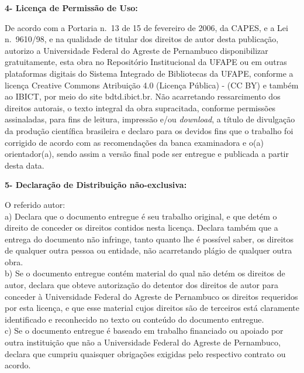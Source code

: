 \documentclass[10pt,a4paper]{article}
\newcommand{\gap}[2]{\vspace{#2mm}}
\begin{document}
\gap{obs-4}{0.8}

\noindent\textbf{4- Licença de Permissão de Uso:}
\gap{4-p1}{-1.6}
\begin{justify}
De acordo com a Portaria n.\ 13 de 15 de fevereiro de 2006, da CAPES, e a Lei n.\ 9610/98, e na qualidade de titular dos direitos de autor desta publicação, autorizo a Universidade Federal do Agreste de Pernambuco disponibilizar gratuitamente, esta obra no Repositório Institucional da UFAPE ou em outras plataformas digitais do Sistema Integrado de Bibliotecas da UFAPE, conforme a licença Creative Commons Atribuição 4.0 (\textquotedbl Licença Pública\textquotedbl) - (CC BY) e também ao IBICT, por meio do site bdtd.ibict.br. Não acarretando ressarcimento dos direitos autorais, o texto integral da obra supracitada, conforme permissões assinaladas, para fins de leitura, impressão e/ou \textit{download}, a título de divulgação da produção científica brasileira e declaro para os devidos fins que o trabalho foi corrigido de acordo com as recomendações da banca examinadora e o(a) orientador(a), sendo assim a versão final pode ser entregue e publicada a partir desta data.
\end{justify}

\gap{4-5}{0.8}

\noindent\textbf{5- Declaração de Distribuição não-exclusiva:}
\gap{5-ref}{1.0}
\begin{justify}
O referido autor:\\
a) Declara que o documento entregue é seu trabalho original, e que detém o direito de conceder os direitos contidos nesta licença. Declara também que a entrega do documento não infringe, tanto quanto lhe é possível saber, os direitos de qualquer outra pessoa ou entidade, não acarretando plágio de qualquer outra obra.\\
b) Se o documento entregue contém material do qual não detém os direitos de autor, declara que obteve autorização do detentor dos direitos de autor para conceder à Universidade Federal do Agreste de Pernambuco os direitos requeridos por esta licença, e que esse material cujos direitos são de terceiros está claramente identificado e reconhecido no texto ou conteúdo do documento entregue.\\
c) Se o documento entregue é baseado em trabalho financiado ou apoiado por outra instituição que não a Universidade Federal do Agreste de Pernambuco, declara que cumpriu quaisquer obrigações exigidas pelo respectivo contrato ou acordo.
\end{justify}
\end{document}
